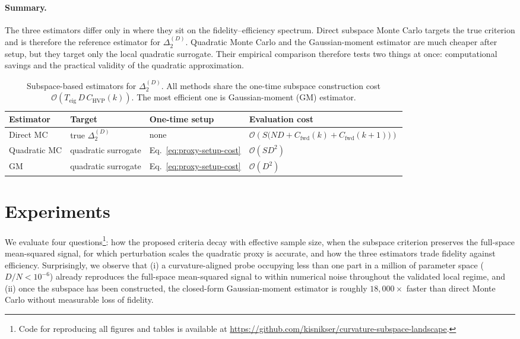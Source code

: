 \documentclass{article}
\begin{document}
\paragraph{Summary.}
The three estimators differ only in where they sit on the fidelity--efficiency spectrum.
Direct subspace Monte Carlo targets the true criterion and is therefore the reference estimator for $\Delta_2^{(D)}$.
Quadratic Monte Carlo and the Gaussian-moment estimator are much cheaper after setup, but they target only the local quadratic surrogate.
Their empirical comparison therefore tests two things at once: computational savings and the practical validity of the quadratic approximation.

\begin{table}[t]
\caption{Subspace-based estimators for $\Delta_2^{(D)}$. All methods share the one-time subspace construction cost $\mathcal O(T_{\mathrm{eig}}\,D\,C_{\mathrm{HVP}}(k))$. The most efficient one is Gaussian-moment (GM) estimator.}
\label{tab:estimator-summary}
\begin{center}
\small
\begin{tabular}{p{1.8cm} p{2.4cm} p{2.1cm} p{5.0cm}}
\toprule
\textbf{Estimator} & \textbf{Target} & \textbf{One-time setup} & \textbf{Evaluation cost} \\
\midrule
Direct MC
&
true $\Delta_2^{(D)}$
&
none
&
$\mathcal O \left(S\bigl(ND + C_{\mathrm{fwd}}(k)+C_{\mathrm{fwd}}(k+1)\bigr)\right)$
\\[0.45em]

Quadratic MC
&
quadratic surrogate
&
Eq.~\eqref{eq:proxy-setup-cost}
&
$\mathcal O(SD^2)$
\\[0.45em]

GM
&
quadratic surrogate
&
Eq.~\eqref{eq:proxy-setup-cost}
&
$\mathcal O(D^2)$
\\
\bottomrule
\end{tabular}
\end{center}
\vspace{-1.4\baselineskip}
\end{table}

\section{Experiments}\label{sec:experiments}

We evaluate four questions\footnote{Code for reproducing all figures and tables is available at \url{https://github.com/kisnikser/curvature-subspace-landscape}.}: how the proposed criteria decay with effective sample size, when the subspace criterion preserves the full-space mean-squared signal, for which perturbation scales the quadratic proxy is accurate, and how the three estimators trade fidelity against efficiency. Surprisingly, we observe that (i) a curvature-aligned probe occupying less than one part in a million of parameter space ($D/N < 10^{-6}$) already reproduces the full-space mean-squared signal to within numerical noise throughout the validated local regime, and (ii) once the subspace has been constructed, the closed-form Gaussian-moment estimator is roughly $18{,}000\times$ faster than direct Monte Carlo without measurable loss of fidelity.
\end{document}
